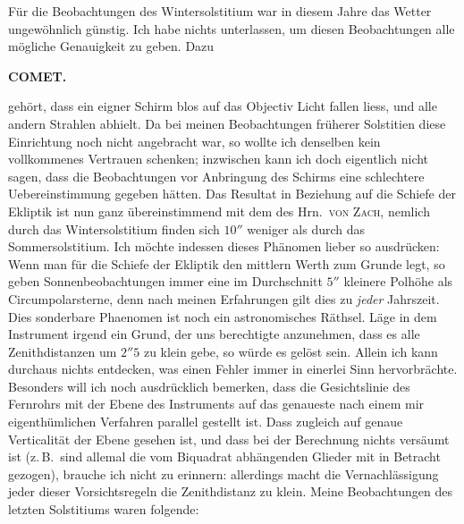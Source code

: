\par\indent Für die Beobachtungen des Wintersolstitium war in diesem Jahre das Wetter ungewöhnlich günstig. Ich habe nichts unterlassen, um diesen Beobachtungen alle mögliche Genauigkeit zu geben. Dazu
\par
\clearpage
\endgroup
\clearpage
\begingroup
\pagestyle{empty}
\thispagestyle{empty}
\noindent{}%
%
\parbox[t]{\dimexpr\linewidth-24mm\relax}{\centering\footnotesize\bfseries COMET.\par}%
\makebox[12mm][r]{}\par\nobreak\medskip
\noindent gehört, dass ein eigner Schirm blos auf das Objectiv Licht fallen liess, und alle andern Strahlen abhielt. Da bei meinen Beobachtungen früherer Solstitien diese Einrichtung noch nicht angebracht war, so wollte ich denselben kein vollkommenes Vertrauen schenken; inzwischen kann ich doch eigentlich nicht sagen, dass die Beobachtungen vor Anbringung des Schirms eine schlechtere Uebereinstimmung gegeben hätten. Das Resultat in Beziehung auf die Schiefe der Ekliptik ist nun ganz übereinstimmend mit dem des Hrn.\ \textsc{von Zach}, nemlich durch das Wintersolstitium finden sich $10''$ weniger als durch das Sommersolstitium. Ich möchte indessen dieses Phänomen lieber so ausdrücken: Wenn man für die Schiefe der Ekliptik den mittlern Werth zum Grunde legt, so geben Sonnenbeobachtungen immer eine im Durchschnitt $5''$ kleinere Polhöhe als Circumpolarsterne, denn nach meinen Erfahrungen gilt dies zu \emph{jeder} Jahrszeit. Dies sonderbare Phaenomen ist noch ein astronomisches Räthsel. Läge in dem Instrument irgend ein Grund, der uns berechtigte anzunehmen, dass es alle Zenithdistanzen um $2''5$ zu klein gebe, so würde es gelöst sein. Allein ich kann durchaus nichts entdecken, was einen Fehler immer in einerlei Sinn hervorbrächte. Besonders will ich noch ausdrücklich bemerken, dass die Gesichtslinie des Fernrohrs mit der Ebene des Instruments auf das genaueste nach einem mir eigenthümlichen Verfahren parallel gestellt ist. Dass zugleich auf genaue Verticalität der Ebene gesehen ist, und dass bei der Berechnung nichts versäumt ist (z.\,B.\ sind allemal die vom Biquadrat abhängenden Glieder mit in Betracht gezogen), brauche ich nicht zu erinnern: allerdings macht die Vernachlässigung jeder dieser Vorsichtsregeln die Zenithdistanz zu klein. Meine Beobachtungen des letzten Solstitiums waren folgende:

